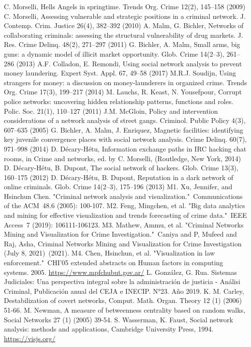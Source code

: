 \documentclass[runningheads]{llncs}
\begin{document}
\begin{thebibliography}{8}
C. Morselli, Hells Angels in springtime. Trends Org. Crime 12(2), 145–158 (2009)
C. Morselli, Assessing vulnerable and strategic positions in a criminal network. J. Contemp. Crim. Justice 26(4), 382–392 (2010)
A. Malm, G. Bichler, Networks of collaborating criminals: assessing the structural vulnerability of drug markets. J. Res. Crime Delinq. 48(2), 271–297 (2011)
G. Bichler, A. Malm, Small arms, big guns: a dynamic model of illicit market opportunity. Glob. Crime 14(2–3), 261–286 (2013)
A.F. Colladon, E. Remondi, Using social network analysis to prevent money laundering. Expert Syst. Appl. 67, 49–58 (2017)
M.R.J. Soudijn, Using strangers for money: a discussion on money-launderers in organized crime. Trends Org. Crime 17(3), 199–217 (2014)
M. Lauchs, R. Keast, N. Yousefpour, Corrupt police networks: uncovering hidden relationship patterns, functions and roles. Polic. Soc. 21(1), 110–127 (2011)
J.M. McGloin, Policy and intervention considerations of a network analysis of street gangs. Criminol. Public Policy 4(3), 607–635 (2005)
G. Bichler, A. Malm, J. Enriquez, Magnetic facilities: identifying key juvenile convergence places with social network analysis. Crime Delinq. 60(7), 971–998 (2014)
D. Décary-Hétu, Information exchange paths in IRC hacking chat rooms, in Crime and networks, ed. by C. Morselli, (Routledge, New York, 2014)
D. Décary-Hétu, B. Dupont, The social network of hackers. Glob. Crime 13(3), 160–175 (2012)
D. Décary-Hétu, B. Dupont, Reputation in a dark network of online criminals. Glob. Crime 14(2–3), 175–196 (2013)
M1. Xu, Jennifer, and Hsinchun Chen. "Criminal network analysis and visualization." Communications of the ACM 48.6 (2005): 100-107.
M2. Feng, Mingchen, et al. "Big data analytics and mining for effective visualization and trends forecasting of crime data." IEEE Access 7 (2019): 106111-106123.
M3. Mathew, Ammu, et al. "Criminal Networks Mining and Visualization for Crime Investigation." Caniya and P, Mufeed and Raj, Asha, Criminal Networks Mining and Visualization for Crime Investigation (July 8, 2021) (2021).
M4. Chen, Hsinchun, et al. "Visualization in law enforcement." CHI'05 extended abstracts on Human factors in computing systems. 2005.
\url{https://www.mpfchubut.gov.ar/}
L. González, G. Rua. Sistemas Judiciales: Una perspectiva integral sobre la administración de justicia - Análisi Criminal, Publicación anual del CEJA e INECIP. N°23. Año 2019.
K. M. Carley, Destabilization of covert networks, Comput. Math. Organ. Theory 12 (1) (2006) 51-66.
M. Newman, A measure of betweenness centrality based on random walks, Social Networks 27 (1) (2005) 39-54.
S. Wasserman, K. Faust, Social network analysis: methods and applications, Cambridge University Press, 1994.
\url{https://visjs.org/}


\end{thebibliography}
\end{document}
